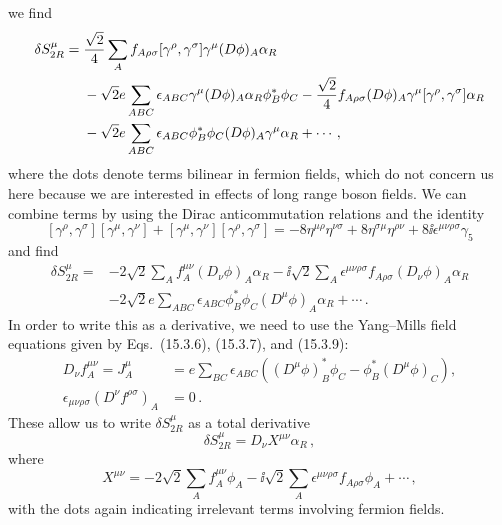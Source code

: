 we find
\[
  \begin{aligned}
  \delta S_{2R}^\mu={}&
  \frac{\sqrt{2}}{4}\sum_A f_{A\rho\sigma}
    [\gamma^\rho,\gamma^\sigma]\gamma^\mu
    (\sl{D}\phi)_A\alpha_R
  \\
  &-\sqrt{2}e\sum_{ABC}\epsilon_{ABC}\gamma^\mu
    (\sl{D}\phi)_A\alpha_R\phi_B^*\phi_C
  -\frac{\sqrt{2}}{4}f_{A\rho\sigma}(\sl{D}\phi)_A
    \gamma^\mu[\gamma^\rho,\gamma^\sigma]\alpha_R
  \\
  &-\sqrt{2}e\sum_{ABC}\epsilon_{ABC}
    \phi_B^*\phi_C(\sl{D}\phi)_A\gamma^\mu\alpha_R+\cdots\,,
  \end{aligned}
\]
where the dots denote terms bilinear in fermion fields, which do not concern
us here because we are interested in effects of long range boson fields. We
can combine terms by using the Dirac anticommutation relations and the
identity
\[
  [\gamma^\rho,\gamma^\sigma][\gamma^\mu,\gamma^\nu]
  +[\gamma^\mu,\gamma^\nu][\gamma^\rho,\gamma^\sigma]
  =-8\eta^{\mu\rho}\eta^{\nu\sigma}
  +8\eta^{\sigma\mu}\eta^{\rho\nu}
  +8\ii\epsilon^{\mu\nu\rho\sigma}\gamma_5
\]
and find
\[
  \begin{aligned}
  \delta S_{2R}^\mu={}&
  -2\sqrt{2}\sum_Af_A^{\mu\nu}(D_\nu\phi)_A\alpha_R
  -\ii\sqrt{2}\sum_A\epsilon^{\mu\nu\rho\sigma}
    f_{A\rho\sigma}(D_\nu\phi)_A\alpha_R
  \\
  &-2\sqrt{2}e\sum_{ABC}\epsilon_{ABC}\phi_B^*\phi_C
    (D^\mu\phi)_A\alpha_R+\cdots\,.
  \end{aligned}
\]
In order to write this as a derivative, we need to use the Yang--Mills field
equations given by Eqs.~(15.3.6), (15.3.7), and (15.3.9):
\[
  \begin{aligned}
  D_\nu f_A^{\mu\nu}
  =J_A^\mu
  &=e\sum_{BC}\epsilon_{ABC}
    \left((D^\mu\phi)_B^*\phi_C-\phi_B^*(D^\mu\phi)_C\right),
  \\
  \epsilon_{\mu\nu\rho\sigma}(D^\nu f^{\rho\sigma})_A&=0\,.
  \end{aligned}
\]
These allow us to write \(\delta S_{2R}^\mu\) as a total derivative
\begin{equation}
  \delta S_{2R}^\mu=D_\nu X^{\mu\nu}\alpha_R\,,
  \tag{27.9.16}\label{eq:27.9.16}
\end{equation}
where
\begin{equation}
  X^{\mu\nu}
  =-2\sqrt{2}\sum_Af_A^{\mu\nu}\phi_A
  -\ii\sqrt{2}\sum_A\epsilon^{\mu\nu\rho\sigma}
    f_{A\rho\sigma}\phi_A+\cdots\,,
  \tag{27.9.17}\label{eq:27.9.17}
\end{equation}
with the dots again indicating irrelevant terms involving fermion fields.
